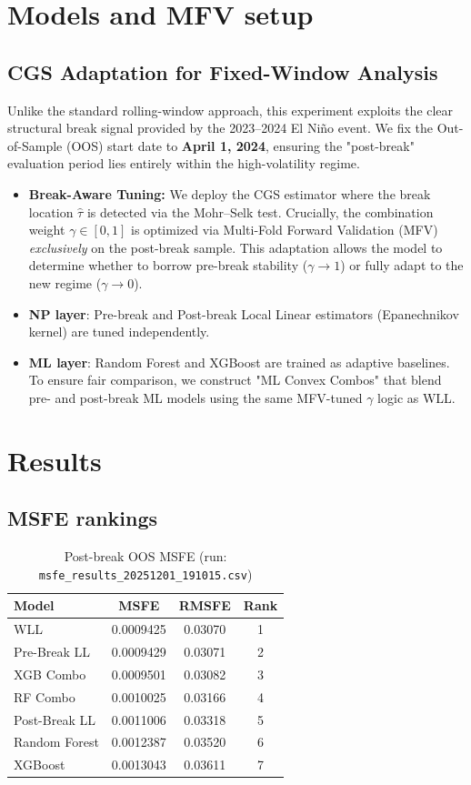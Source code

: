\documentclass[11pt]{article}
\begin{document}
\section{Models and MFV setup}
\subsection{CGS Adaptation for Fixed-Window Analysis}
Unlike the standard rolling-window approach, this experiment exploits the clear structural break signal provided by the 2023--2024 El Ni\~no event. We fix the Out-of-Sample (OOS) start date to \textbf{April 1, 2024}, ensuring the "post-break" evaluation period lies entirely within the high-volatility regime.
\begin{itemize}
  \item \textbf{Break-Aware Tuning:} We deploy the CGS estimator where the break location $\hat{\tau}$ is detected via the Mohr--Selk test. Crucially, the combination weight $\gamma \in [0,1]$ is optimized via Multi-Fold Forward Validation (MFV) \textit{exclusively} on the post-break sample. This adaptation allows the model to determine whether to borrow pre-break stability ($\gamma \to 1$) or fully adapt to the new regime ($\gamma \to 0$).
  \item \textbf{NP layer}: Pre-break and Post-break Local Linear estimators (Epanechnikov kernel) are tuned independently.
  \item \textbf{ML layer}: Random Forest and XGBoost are trained as adaptive baselines. To ensure fair comparison, we construct "ML Convex Combos" that blend pre- and post-break ML models using the same MFV-tuned $\gamma$ logic as WLL.
\end{itemize}

\section{Results}
\subsection{MSFE rankings}
\begin{table}[h]
\centering
\caption{Post-break OOS MSFE (run: \texttt{msfe\_results\_20251201\_191015.csv})}
\label{tab:msfe}
\begin{tabular}{lccc}
\toprule
Model & MSFE & RMSFE & Rank \\
\midrule
WLL & 0.0009425 & 0.03070 & 1 \\
Pre-Break LL & 0.0009429 & 0.03071 & 2 \\
XGB Combo & 0.0009501 & 0.03082 & 3 \\
RF Combo & 0.0010025 & 0.03166 & 4 \\
Post-Break LL & 0.0011006 & 0.03318 & 5 \\
Random Forest & 0.0012387 & 0.03520 & 6 \\
XGBoost & 0.0013043 & 0.03611 & 7 \\
\bottomrule
\end{tabular}
\end{table}
\end{document}
